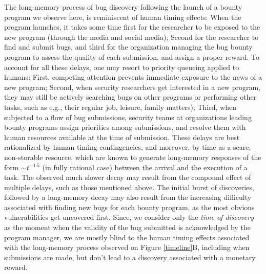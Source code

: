 The long-memory process of bug discovery following the launch of a bounty program we observe here, is reminiscent of human timing effects: When the program launches, it takes some time first for the researcher to be exposed to the new program (through the media and social media); Second for the researcher to find and submit bugs, and third for the organization managing the bug bounty program to assess the quality of each submission, and assign a proper reward. To account for all these delays, one may resort to priority queueing applied to humans: First, competing attention prevents immediate exposure to the news of a new program; Second, when security researchers get interested in a new program, they may still be actively searching bugs on other programs or performing other tasks, such as e.g., their regular job, leisure, family matters); Third, when subjected to a flow of bug submissions, security teams at organizations leading bounty programs assign priorities among submissions, and resolve them with human resources available at the time of submission. These delays are best rationalized by human timing contingencies, and moreover, by time as a scare, non-storable resource, which are known to generate long-memory responses of the form $\sim t^{-1.5}$ (in fully rational case) between the arrival and the execution of a task\cite{maillart2011quantification}. The observed much slower decay may result from the compound effect of multiple delays, such as those mentioned above. The initial burst of discoveries, followed by a long-memory decay may also result from the increasing difficulty associated with finding new bugs for each bounty program, as the most obvious vulnerabilities get uncovered first.  Since, we consider only the {\it time of discovery} as the moment when the validity of the bug submitted is acknowledged by the program manager, we are mostly blind to the human timing effects associated with the long-memory process observed on Figure \ref{timeline}B, including when submissions are made, but don't lead to a discovery associated with a monetary reward.\\

